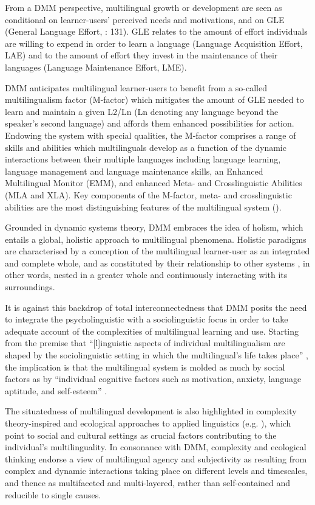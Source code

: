 \documentclass[output=paper]{../langscibook}
\begin{document}
From a DMM perspective, multilingual growth or development are seen as conditional on learner-users’ perceived needs and motivations, and on GLE (General Language Effort, \citealt{HerdinaJessner2002}: 131). GLE relates to the amount of effort individuals are willing to expend in order to learn a language (Language Acquisition Effort, LAE) and to the amount of effort they invest in the maintenance of their languages (Language Maintenance Effort, LME). 

DMM anticipates multilingual learner-users to benefit from a so-called multilingualism factor (M-factor) which mitigates the amount of GLE needed to learn and maintain a given L2/Ln (Ln denoting any language beyond the speaker’s second language) and affords them enhanced possibilities for action.  Endowing the system with special qualities, the M-factor comprises a range of skills and abilities which multilinguals develop as a function of the dynamic interactions between their multiple languages including language learning, language management and language maintenance skills, an Enhanced Multilingual Monitor (EMM), and enhanced Meta- and Crosslinguistic Abilities (MLA and XLA). Key components of the M-factor, meta- and crosslinguistic abilities are the most distinguishing features of the multilingual system (\citealt{JessnerEtAl2018}). 

Grounded in dynamic systems theory, DMM embraces the idea of holism, which entails a global, holistic approach to multilingual phenomena. Holistic paradigms are characterised by a conception of the multilingual learner-user as an integrated and complete whole, and as constituted by their relationship to other systems \citep[44]{Philips2000}, in other words, nested in a greater whole and continuously interacting with its surroundings. 

It is against this backdrop of total interconnectedness that DMM posits the need to integrate the psycholinguistic with a sociolinguistic focus in order to take adequate account of the complexities of multilingual learning and use. Starting from the premise that “[l]inguistic aspects of individual multilingualism are shaped by the sociolinguistic setting in which the multilingual’s life takes place” \citep[273]{Jessner2008}, the implication is that the multilingual system is molded as much by social factors as by “individual cognitive factors such as motivation, anxiety, language aptitude, and self-esteem” \citep[274]{Jessner2008}. 

The situatedness of multilingual development is also highlighted in complexity theory-inspired and ecological approaches to applied linguistics (e.g. \citealt{Kramsch2012,Larsen-FreemanCameron2008,LaoireAronin2004}), which point to social and cultural settings as crucial factors contributing to the individual’s multilinguality. In consonance with DMM, complexity and ecological thinking endorse a view of multilingual agency and subjectivity as resulting from complex and dynamic interactions taking place on different levels and timescales, and thence as multifaceted and multi-layered, rather than self-contained and reducible to single causes.
\end{document}
